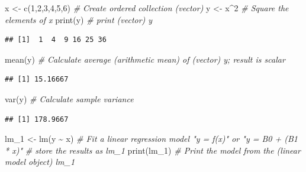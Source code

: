 \documentclass[
]{book}
\newenvironment{Shaded}{\begin{snugshade}}{\end{snugshade}}
\newcommand{\CommentTok}[1]{\textcolor[rgb]{0.56,0.35,0.01}{\textit{#1}}}
\newcommand{\DecValTok}[1]{\textcolor[rgb]{0.00,0.00,0.81}{#1}}
\newcommand{\FunctionTok}[1]{\textcolor[rgb]{0.00,0.00,0.00}{#1}}
\newcommand{\NormalTok}[1]{#1}
\newcommand{\OtherTok}[1]{\textcolor[rgb]{0.56,0.35,0.01}{#1}}
\newcommand{\SpecialCharTok}[1]{\textcolor[rgb]{0.00,0.00,0.00}{#1}}
\begin{document}
\begin{Shaded}
\begin{Highlighting}[]
\NormalTok{x }\OtherTok{\textless{}{-}} \FunctionTok{c}\NormalTok{(}\DecValTok{1}\NormalTok{,}\DecValTok{2}\NormalTok{,}\DecValTok{3}\NormalTok{,}\DecValTok{4}\NormalTok{,}\DecValTok{5}\NormalTok{,}\DecValTok{6}\NormalTok{)   }\CommentTok{\# Create ordered collection (vector)}
\NormalTok{y }\OtherTok{\textless{}{-}}\NormalTok{ x}\SpecialCharTok{\^{}}\DecValTok{2}              \CommentTok{\# Square the elements of x}
\FunctionTok{print}\NormalTok{(y)              }\CommentTok{\# print (vector) y}
\end{Highlighting}
\end{Shaded}

\begin{verbatim}
## [1]  1  4  9 16 25 36
\end{verbatim}

\begin{Shaded}
\begin{Highlighting}[]
\FunctionTok{mean}\NormalTok{(y)               }\CommentTok{\# Calculate average (arithmetic mean) of (vector) y; result is scalar}
\end{Highlighting}
\end{Shaded}

\begin{verbatim}
## [1] 15.16667
\end{verbatim}

\begin{Shaded}
\begin{Highlighting}[]
\FunctionTok{var}\NormalTok{(y)                }\CommentTok{\# Calculate sample variance}
\end{Highlighting}
\end{Shaded}

\begin{verbatim}
## [1] 178.9667
\end{verbatim}

\begin{Shaded}
\begin{Highlighting}[]
\NormalTok{lm\_1 }\OtherTok{\textless{}{-}} \FunctionTok{lm}\NormalTok{(y }\SpecialCharTok{\textasciitilde{}}\NormalTok{ x)     }\CommentTok{\# Fit a linear regression model "y = f(x)" or "y = B0 + (B1 * x)"}
                      \CommentTok{\# store the results as lm\_1}
\FunctionTok{print}\NormalTok{(lm\_1)           }\CommentTok{\# Print the model from the (linear model object) lm\_1}
\end{Highlighting}
\end{Shaded}
\end{document}
